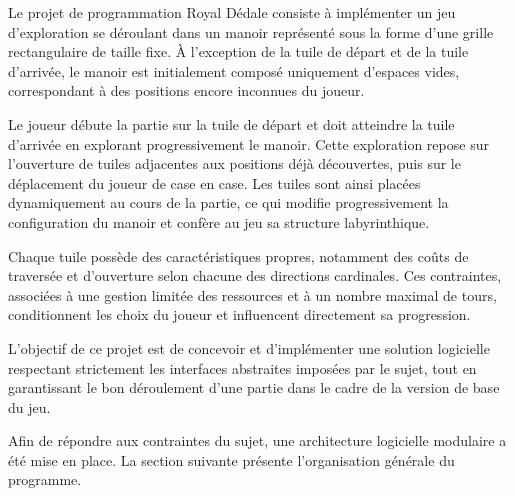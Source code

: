 Le projet de programmation Royal Dédale consiste à implémenter un jeu d’exploration se déroulant dans un manoir représenté sous la forme d’une grille rectangulaire de taille fixe. À l’exception de la tuile de départ et de la tuile d’arrivée, le manoir est initialement composé uniquement d’espaces vides, correspondant à des positions encore inconnues du joueur.

Le joueur débute la partie sur la tuile de départ et doit atteindre la tuile d’arrivée en explorant progressivement le manoir. Cette exploration repose sur l’ouverture de tuiles adjacentes aux positions déjà découvertes, puis sur le déplacement du joueur de case en case. Les tuiles sont ainsi placées dynamiquement au cours de la partie, ce qui modifie progressivement la configuration du manoir et confère au jeu sa structure labyrinthique.

Chaque tuile possède des caractéristiques propres, notamment des coûts de traversée et d’ouverture selon chacune des directions cardinales. Ces contraintes, associées à une gestion limitée des ressources et à un nombre maximal de tours, conditionnent les choix du joueur et influencent directement sa progression.

L’objectif de ce projet est de concevoir et d’implémenter une solution logicielle respectant strictement les interfaces abstraites imposées par le sujet, tout en garantissant le bon déroulement d’une partie dans le cadre de la version de base du jeu.

Afin de répondre aux contraintes du sujet, une architecture logicielle modulaire a été mise en place. La section suivante présente l’organisation générale du programme.
